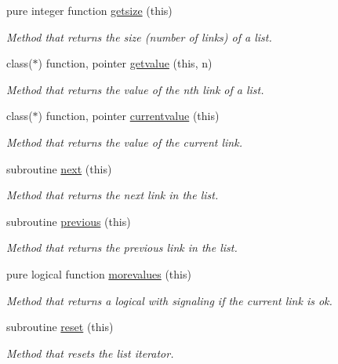 \begin{DoxyCompactItemize}
pure integer function \mbox{\hyperlink{namespaceabstract__linkedlist__mod_ab4e548906863da517d7fedb02931b79f}{getsize}} (this)
\begin{DoxyCompactList}\small\item\em Method that returns the size (number of links) of a list. \end{DoxyCompactList}\item 
class($\ast$) function, pointer \mbox{\hyperlink{namespaceabstract__linkedlist__mod_a3c3ad627fd9f87da9831c53802975104}{getvalue}} (this, n)
\begin{DoxyCompactList}\small\item\em Method that returns the value of the nth link of a list. \end{DoxyCompactList}\item 
class($\ast$) function, pointer \mbox{\hyperlink{namespaceabstract__linkedlist__mod_a87a81a4be29c8d4e8d2fb0d02247033b}{currentvalue}} (this)
\begin{DoxyCompactList}\small\item\em Method that returns the value of the current link. \end{DoxyCompactList}\item 
subroutine \mbox{\hyperlink{namespaceabstract__linkedlist__mod_a576f148096561712d6ddd8c848bc7c4b}{next}} (this)
\begin{DoxyCompactList}\small\item\em Method that returns the next link in the list. \end{DoxyCompactList}\item 
subroutine \mbox{\hyperlink{namespaceabstract__linkedlist__mod_a0b36d862899c5a40cb98bef4ffd5e2f4}{previous}} (this)
\begin{DoxyCompactList}\small\item\em Method that returns the previous link in the list. \end{DoxyCompactList}\item 
pure logical function \mbox{\hyperlink{namespaceabstract__linkedlist__mod_a91ec7f6e570a87769ebb3d11b33f577e}{morevalues}} (this)
\begin{DoxyCompactList}\small\item\em Method that returns a logical with signaling if the current link is ok. \end{DoxyCompactList}\item 
subroutine \mbox{\hyperlink{namespaceabstract__linkedlist__mod_a46ff8b8a3ab81610eb47d72d742778c3}{reset}} (this)
\begin{DoxyCompactList}\small\item\em Method that resets the list iterator. \end{DoxyCompactList}\end{DoxyCompactItemize}


